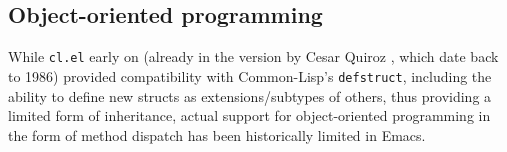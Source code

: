 \documentclass[format=acmsmall, review=false, screen=true]{acmart}
\begin{document}

\subsection{Object-oriented programming} %

While \texttt{cl.el} early on (already in the version by Cesar Quiroz
, which date back to 1986) provided
compatibility with Common-Lisp's \texttt{defstruct}, including the ability
to define new structs as extensions/subtypes of others, thus providing
a limited form of inheritance, actual support for object-oriented
programming in the form of method dispatch has been historically limited
in Emacs.
\end{document}
